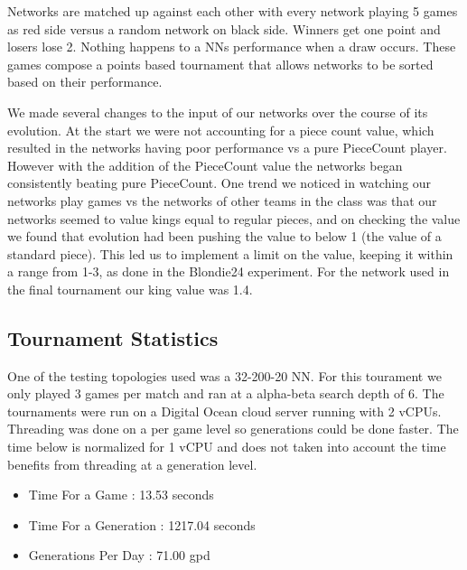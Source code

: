 \documentclass{article}
\begin{document}
Networks are matched up against each other with
every network playing 5 games as red side versus a random network on black
side. Winners get one point and losers lose 2. Nothing happens to a NNs
performance when a draw occurs. These games compose a points based tournament
that allows networks to be sorted based on their performance.

We made several changes to the input of our networks over the course of its evolution. At the start we were not accounting for a piece count value, which resulted in the networks having poor performance vs a pure PieceCount player. However with the addition of the PieceCount value the networks began consistently beating pure PieceCount.
One trend we noticed in watching our networks play games vs the networks of other teams in the class was that our networks seemed to value kings equal to regular pieces, and on checking the value we found that evolution had been pushing the value to below 1 (the value of a standard piece). This led us to implement a limit on the value, keeping it within a range from 1-3, as done in the Blondie24 experiment. For the network used in the final tournament our king value was 1.4.

\subsection{Tournament Statistics}

One of the testing topologies used was a 32-200-20 NN. For this tourament we only
played 3 games per match and ran at a alpha-beta search depth of 6. The tournaments
were run on a Digital Ocean cloud server running with 2 vCPUs. Threading was done
on a per game level so generations could be done faster. The time below is normalized for
1 vCPU and does not taken into account the time benefits from threading at a generation
level.

\begin{itemize}
    \item Time For a Game       : 13.53 seconds
    \item Time For a Generation : 1217.04 seconds
    \item Generations Per Day   : 71.00 gpd
\end{itemize}
\end{document}
